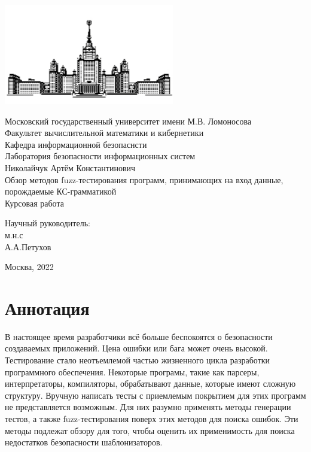 \documentclass[a4paper]{article}
\begin{document}
 
\begin{center}
\includegraphics{MSU}

\hfill \break
\normalsize{Московский государственный университет имени М.В. Ломоносова}\\
\normalsize{Факультет вычислительной математики и кибернетики}\\
\normalsize{Кафедра информационной безопаснсти}\\
\normalsize{Лаборатория безопасности информационных систем}\\
 \hfill \break
\normalsize{Николайчук Артём Константинович}\\
\hfill\break
\hfill \break
\hfill \break
\hfill \break
\large{Обзор методов fuzz-тестирования программ, принимающих на вход
данные, порождаемые КС-грамматикой}\\
\hfill \break
\hfill \break
\hfill \break
\normalsize{Курсовая работа}\\
\hfill \break
\hfill \break
\hfill \break
\hfill \break
\hfill \break
\hfill \break
\hfill \break
\hfill \break
\begin{flushright}
    \normalsize{Научный руководитель:}\\
    \normalsize{м.н.с}\\
    \normalsize{А.А.Петухов}\\
\end{flushright}
\end{center}
\vspace*{\fill}
\begin{center} Москва, 2022 \end{center}
\thispagestyle{empty}
 
\newpage
\section*{Аннотация}
\indent

В настоящее время разработчики всё больше беспокоятся о безопасности создаваемых приложений. Цена ошибки или бага может очень высокой. Тестирование стало неотъемлемой частью жизненного цикла разработки программного обеспечения. Некоторые програмы, такие как парсеры, интерпретаторы, компиляторы, обрабатывают данные, которые имеют сложную структуру. Вручную написать тесты с приемлемым покрытием для этих программ не представляется возможным. Для них разумно применять методы
генерации тестов, а также fuzz-тестирования поверх этих методов для
поиска ошибок. Эти методы подлежат обзору для того, чтобы оценить их
применимость для поиска недостатков безопасности шаблонизаторов.
\newpage
    \tableofcontents
\newpage
 
\end{document}

